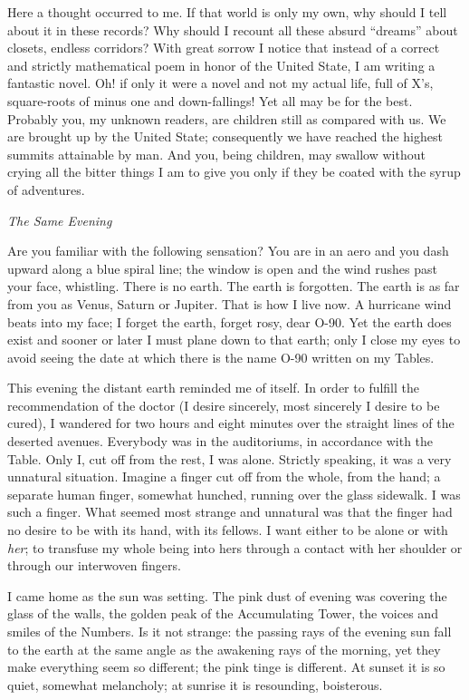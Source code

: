 \documentclass[11pt,openany]{book}
\begin{document}
Here a thought occurred to me. If that world is only my own, why should I tell about it in these records? Why should I recount all these absurd ``dreams'' about closets, endless corridors? With great sorrow I notice that instead of a correct and strictly mathematical poem in honor of the United State, I am writing a fantastic novel. Oh! if only it were a novel and not my actual life, full of X's, square-roots of minus one and down-fallings! Yet all may be for the best. Probably you, my unknown readers, are children still as compared with us. We are brought up by the United State; consequently we have reached the highest summits attainable by man. And you, being children, may swallow without crying all the bitter things I am to give you only if they be coated with the syrup of adventures.

    

\emph{The Same Evening}

Are you familiar with the following sensation? You are in an aero and you dash upward along a blue spiral line; the window is open and the wind rushes past your face, whistling. There is no earth. The earth is forgotten. The earth is as far from you as Venus, Saturn or Jupiter. That is how I live now. A hurricane wind beats into my face; I forget the earth, forget rosy, dear O-90. Yet the earth does exist and sooner or later I must plane down to that earth; only I close my eyes to avoid seeing the date at which there is the name O-90 written on my Tables.

This evening the distant earth reminded me of itself. In order to fulfill the recommendation of the doctor (I desire sincerely, most sincerely I desire to be cured), I wandered for two hours and eight minutes over the straight lines of the deserted avenues. Everybody was in the auditoriums, in accordance with the Table. Only I, cut off from the rest, I was alone. Strictly speaking, it was a very unnatural situation. Imagine a finger cut off from the whole, from the hand; a separate human finger, somewhat hunched, running over the glass sidewalk. I was such a finger. What seemed most strange and unnatural was that the finger had no desire to be with its hand, with its fellows. I want either to be alone or with \emph{her}; to transfuse my whole being into hers through a contact with her shoulder or through our interwoven fingers.

I came home as the sun was setting. The pink dust of evening was covering the glass of the walls, the golden peak of the Accumulating Tower, the voices and smiles of the Numbers. Is it not strange: the passing rays of the evening sun fall to the earth at the same angle as the awakening rays of the morning, yet they make everything seem so different; the pink tinge is different. At sunset it is so quiet, somewhat melancholy; at sunrise it is resounding, boisterous.
\end{document}
